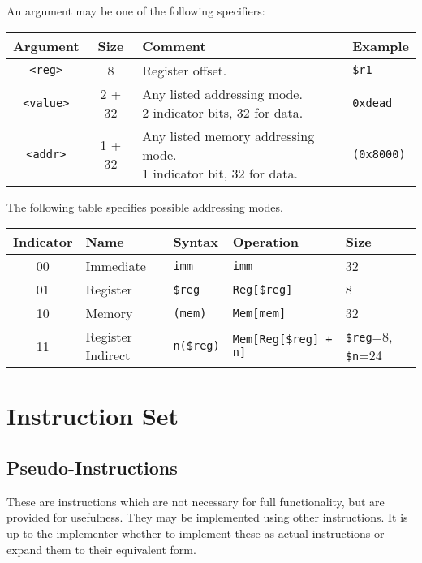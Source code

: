\documentclass[10pt]{article}
\begin{document}
    An argument may be one of the following specifiers:

    \medskip
    \begin{tabular}{|c|c|l|l|}
        \hline
        \textbf{Argument} & \textbf{Size} & \textbf{Comment} & \textbf{Example} \\
        \hline
        \texttt{<reg>} & 8 & Register offset. & \texttt{\$r1} \\
        \hline
        \texttt{<value>} & 2 + 32 & \makecell[l]{Any listed addressing mode.\\%
        2 indicator bits, 32 for data.} & \texttt{0xdead} \\
        \hline
        \texttt{<addr>} & 1 + 32 & \makecell[l]{Any listed memory addressing mode.\\%
        1 indicator bit, 32 for data.} & \texttt{(0x8000)} \\
        \hline
    \end{tabular}
    \medskip

    The following table specifies possible addressing modes.

    \medskip
    \begin{tabular}{|c|l|l|l|l|}
        \hline
        \textbf{Indicator} & \textbf{Name} & \textbf{Syntax} & \textbf{Operation} & \textbf{Size} \\
        \hline
        00 & Immediate & \texttt{imm} & \texttt{imm} & 32 \\
        01 & Register & \texttt{\$reg} & \texttt{Reg[\$reg]} & 8 \\
        10 & Memory & \texttt{(mem)} & \texttt{Mem[mem]} & 32\\
        11 & Register Indirect & \texttt{n(\$reg)} & \texttt{Mem[Reg[\$reg] + n]} & \texttt{\$reg}=8, \texttt{\$n}=24 \\
        \hline
    \end{tabular}

    \section{Instruction Set}\label{sec:instruction-set}

    

    \subsection{Pseudo-Instructions}\label{subsec:pseudo-instructions}

    These are instructions which are not necessary for full functionality, but are provided for usefulness.
    They may be implemented using other instructions.
    It is up to the implementer whether to implement these as actual instructions or expand them to their equivalent form.
\end{document}
